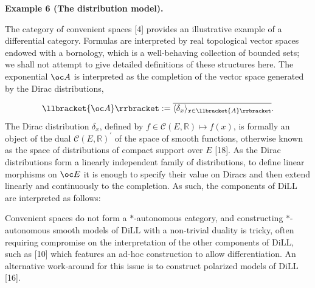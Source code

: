 \par\medskip\noindent\textbf{Example 6 (The distribution model).}\par
 
 
The category of convenient spaces [4] provides an illustrative example of a differential category. Formulas are interpreted by real topological vector spaces endowed with a bornology, which is a well-behaving collection of bounded sets; we shall not attempt to give detailed definitions of these structures here. The exponential $\oc A$ is interpreted as the completion of the vector space generated by the Dirac distributions,\par
    \[\llbracket{\oc A}\rrbracket:=\overline{\langle\delta_{x}\rangle_{x\in\llbracket{A}\rrbracket}}.\]    
The Dirac distribution $\delta_{x}$, defined by $f\in\mathscr{C}(E,\mathbb{R})\mapsto f(x)$, is formally an object of the dual $\mathscr{C}(E,\mathbb{R})^{\prime}$ of the space of smooth functions, otherwise known as the space of distributions of compact support over $E$ [18]. As the Dirac distributions form a linearly independent family of distributions, to define linear morphisms on $\oc E$ it is enough to specify their value on Diracs and then extend linearly and continuously to the completion. As such, the components of $\mathrm{DiLL}$ are interpreted as follows:\par
 
\begin{center}\end{center}
 
Convenient spaces do not form a $\ast$-autonomous category, and constructing $\ast$-autonomous smooth models of $\mathrm{DiLL}$ with a non-trivial duality is tricky, often requiring compromise on the interpretation of the other components of $\mathrm{DiLL}$, such as [10] which features an ad-hoc construction to allow differentiation. An alternative work-around for this issue is to construct polarized models of $\mathrm{DiLL}$ [16].\par
 
